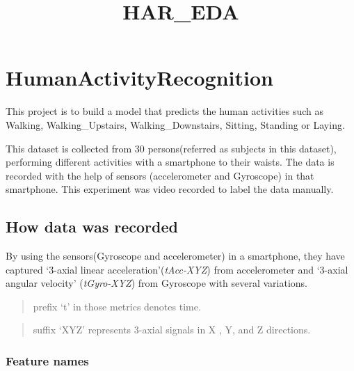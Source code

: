 \documentclass[11pt]{article}
\title{HAR\_EDA}
\begin{document}
    
    
    \maketitle
    
    

    
    \hypertarget{humanactivityrecognition}{%
\section{HumanActivityRecognition}\label{humanactivityrecognition}}

This project is to build a model that predicts the human activities such
as Walking, Walking\_Upstairs, Walking\_Downstairs, Sitting, Standing or
Laying.

This dataset is collected from 30 persons(referred as subjects in this
dataset), performing different activities with a smartphone to their
waists. The data is recorded with the help of sensors (accelerometer and
Gyroscope) in that smartphone. This experiment was video recorded to
label the data manually.

\hypertarget{how-data-was-recorded}{%
\subsection{How data was recorded}\label{how-data-was-recorded}}

By using the sensors(Gyroscope and accelerometer) in a smartphone, they
have captured `3-axial linear acceleration'(\emph{tAcc-XYZ}) from
accelerometer and `3-axial angular velocity' (\emph{tGyro-XYZ}) from
Gyroscope with several variations.

\begin{quote}
prefix `t' in those metrics denotes time.
\end{quote}

\begin{quote}
suffix `XYZ' represents 3-axial signals in X , Y, and Z directions.
\end{quote}

\hypertarget{feature-names}{%
\subsubsection{Feature names}\label{feature-names}}
\end{document}

